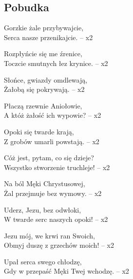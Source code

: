 
\subsection{Pobudka}

\begin{flushright}
Gorzkie żale przybywajcie,\\ 
Serca nasze przenikajcie. -- x2

Rozpłyńcie się me źrenice,\\ 
Toczcie smutnych łez krynice. -- x2

Słońce, gwiazdy omdlewają,\\ 
Żałobą się pokrywają. -- x2

Płaczą rzewnie Aniołowie, \\ 
A któż żałość ich wypowie?  -- x2

Opoki się twarde krają,\\ 
Z grobów umarli powstają. -- x2

Cóż jest, pytam, co się dzieje?\\
Wszystko stworzenie truchleje! -- x2 

Na ból Męki Chrystusowej,\\ 
Żal przejmuje bez wymowy. -- x2 

Uderz, Jezu, bez odwłoki,\\
W twarde serc naszych opoki! -- x2 

Jezu mój, we krwi ran Swoich,\\
Obmyj duszę z grzechów moich! -- x2 

Upał serca swego chłodzę,\\
Gdy w przepaść Męki Twej wchodzę. --  x2
\end{flushright}
